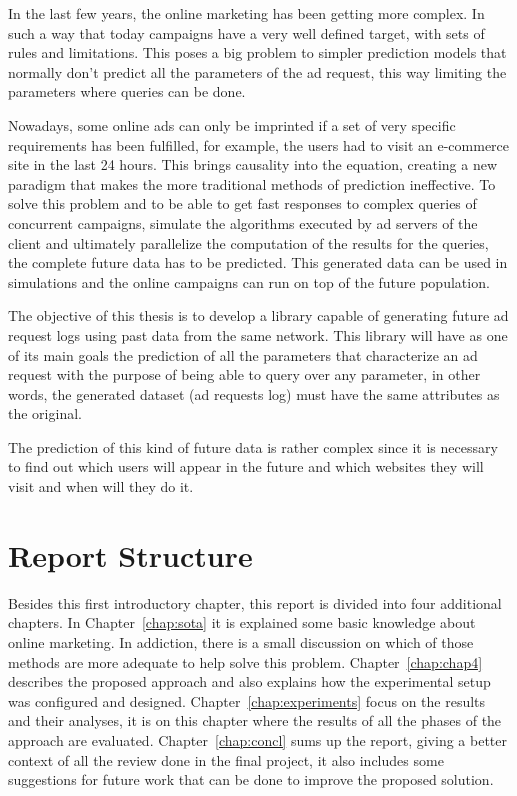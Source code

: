 In the last few years, the online marketing has been getting more complex. In
such a way that today campaigns have a very well defined target, with
sets of rules and limitations. This poses a big problem to
simpler prediction models that normally don't predict all the parameters of the
ad request, this way limiting the parameters where queries can be done.


Nowadays, some online ads can only be imprinted if a set of very specific requirements has been fulfilled, for example,
the users had to visit an e-commerce site in the last 24 hours. This brings causality into the equation, creating a new paradigm that makes 
the more traditional methods of prediction ineffective. To solve this problem
and to be able to get fast responses to complex queries of concurrent campaigns,
simulate the algorithms executed by ad servers of the client
and ultimately parallelize the computation of the results for the
queries,
the complete future data has to be predicted. This generated data
can be used in simulations and the online campaigns can run on top of the future population.

The objective of this thesis is to develop a library capable of generating
future ad request logs using past data from the same network.
This library will have as one of its main goals the prediction of all the parameters that characterize an
ad request with the purpose of being able to query over any parameter, in other
words, the generated dataset (ad requests log) must have the same attributes as the original.

The prediction of this kind of future data is rather complex since it is
necessary to find out which users will appear in the future and which websites they
will visit and when will they do it.

\section{Report Structure} \label{sec:struct}

Besides this first introductory chapter, this report is divided into four additional chapters.
In Chapter~\ref{chap:sota} it is explained some basic knowledge about online marketing. In addiction, there is
a small discussion on which of those methods are more adequate to help solve this problem.
Chapter~\ref{chap:chap4} describes the proposed approach and also explains how
the experimental setup was configured and designed.
Chapter~\ref{chap:experiments} focus on the results and their analyses, it is on
this chapter where the results of all the phases of the approach are evaluated.
Chapter~\ref{chap:concl} sums up the report, giving a better context of all the
review done in the final project, it also includes some suggestions for future
work that can be done to improve the proposed solution.

